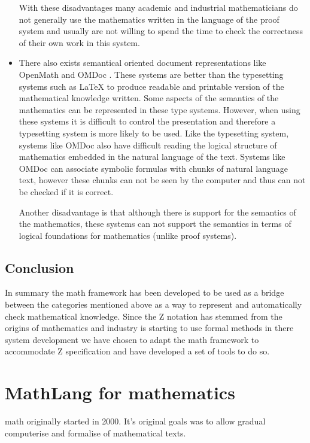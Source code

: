 \begin{itemize}
With these disadvantages many academic and industrial mathematicians do not generally use the mathematics written in the language of the proof system and usually are not willing to spend the time to check the correctness of their own work in this system.

\item There also exists semantical oriented document representations like OpenMath \cite{openmath} and OMDoc \cite{omdoc}. These systems are better than the typesetting systems such as \LaTeX{} to produce readable and printable version of the mathematical knowledge written. Some aspects of the semantics of the mathematics can be represented in these type systems. However, when using these systems it is difficult to control the presentation and therefore a typesetting system is more likely to be used. Like the typesetting system, systems like OMDoc also have difficult reading the logical structure of mathematics embedded in the natural language of the text. Systems like OMDoc can associate symbolic formulas with chunks of natural language text, however these chunks can not be seen by the computer and thus can not be checked if it is correct.

Another disadvantage is that although there is support for the semantics of the mathematics, these systems can not support the semantics in terms of logical foundations for mathematics (unlike proof systems).
\end{itemize}


\subsection{Conclusion}

In summary the \gls{math} framework has been developed to be used as a bridge between the categories mentioned above as a way to represent and automatically check mathematical knowledge. Since the Z notation has stemmed from the origins of mathematics and industry is starting to use formal methods in there system development we have chosen to adapt the \gls{math} framework to accommodate Z specification and have developed a set of tools to do so.

\section{MathLang for mathematics}
\label{sec:mathlangbackground}

\Gls{math} originally started in 2000. It's original goals was to allow gradual \gls{computerise} and \gls{formalise} of mathematical texts.

